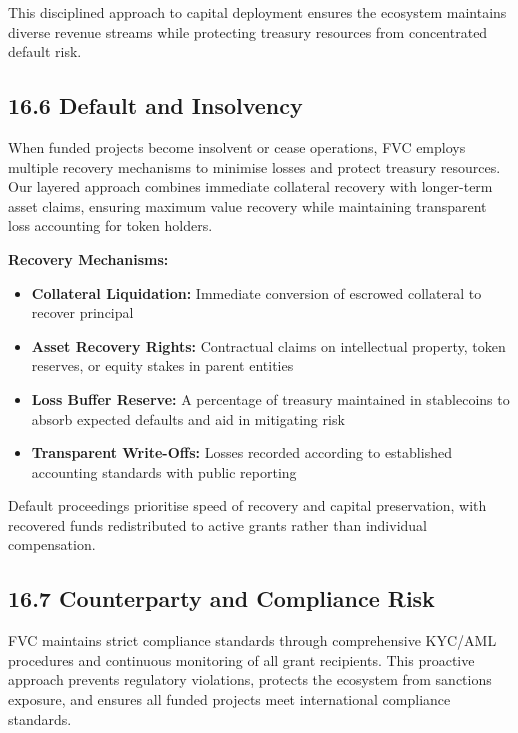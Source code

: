 \documentclass[
  paper=a4,
  ,captions=tableheading
]{scrartcl}
\providecommand{\tightlist}{%
  \setlength{\itemsep}{0pt}\setlength{\parskip}{0pt}}
\begin{document}
This disciplined approach to capital deployment ensures the ecosystem
maintains diverse revenue streams while protecting treasury resources
from concentrated default risk.

\subsection{16.6 Default and Insolvency}\label{default-and-insolvency}

When funded projects become insolvent or cease operations, FVC employs
multiple recovery mechanisms to minimise losses and protect treasury
resources. Our layered approach combines immediate collateral recovery
with longer-term asset claims, ensuring maximum value recovery while
maintaining transparent loss accounting for token holders.

\textbf{Recovery Mechanisms:}

\begin{itemize}
\tightlist
\item
  \textbf{Collateral Liquidation:} Immediate conversion of escrowed
  collateral to recover principal
\item
  \textbf{Asset Recovery Rights:} Contractual claims on intellectual
  property, token reserves, or equity stakes in parent entities
\item
  \textbf{Loss Buffer Reserve:} A percentage of treasury maintained in
  stablecoins to absorb expected defaults and aid in mitigating risk
\item
  \textbf{Transparent Write-Offs:} Losses recorded according to
  established accounting standards with public reporting
\end{itemize}

Default proceedings prioritise speed of recovery and capital
preservation, with recovered funds redistributed to active grants rather
than individual compensation.

\subsection{16.7 Counterparty and Compliance
Risk}\label{counterparty-and-compliance-risk}

FVC maintains strict compliance standards through comprehensive
KYC/AML procedures and continuous monitoring of all grant recipients.
This proactive approach prevents regulatory violations, protects the
ecosystem from sanctions exposure, and ensures all funded projects meet
international compliance standards.
\end{document}

